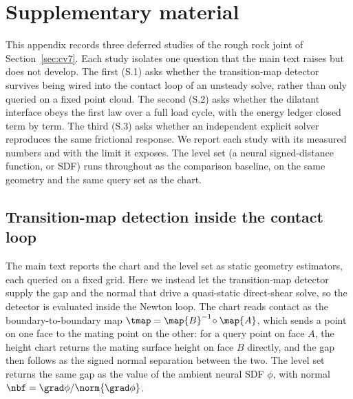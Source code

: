 \section{Supplementary material}\label{app:supp}

This appendix records three deferred studies of the rough rock joint of Section~\ref{sec:cv7}. Each
study isolates one question that the main text raises but does not develop. The first (S.1) asks whether
the transition-map detector survives being wired into the contact loop of an unsteady solve, rather than
only queried on a fixed point cloud. The second (S.2) asks whether the dilatant interface obeys the first
law over a full load cycle, with the energy ledger closed term by term. The third (S.3) asks whether an
independent explicit solver reproduces the same frictional response. We report each study with its
measured numbers and with the limit it exposes. The level set (a neural signed-distance function, or SDF)
runs throughout as the comparison baseline, on the same geometry and the same query set as the chart.

\subsection{Transition-map detection inside the contact loop}\label{app:supp:p3}

The main text reports the chart and the level set as static geometry estimators, each queried on a fixed
grid. Here we instead let the transition-map detector supply the gap and the normal that drive a
quasi-static direct-shear solve, so the detector is evaluated inside the Newton loop. The chart reads
contact as the boundary-to-boundary map $\tmap=\map{B}^{-1}\!\circ\map{A}$, which sends a point on one
face to the mating point on the other: for a query point on face $A$, the height chart returns the mating
surface height on face $B$ directly, and the gap then follows as the signed normal separation between the
two. The level set returns the same gap as the value of the ambient neural SDF $\phi$, with normal
$\nbf=\grad\phi/\norm{\grad\phi}$.


